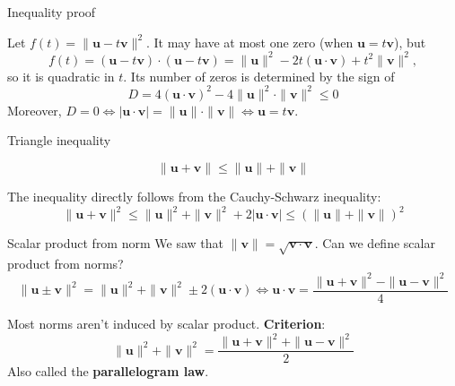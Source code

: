 \documentclass[10pt]{beamer}
\begin{document}
\begin{frame}{Inequality proof}
    \begin{center}
        
    \end{center}
    Let $f(t) = \|\mathbf u - t \mathbf v\|^2$. It may have at most one zero (when $\mathbf u = t \mathbf v$), but
    $$
    f(t) = (\mathbf u - t \mathbf v)\cdot (\mathbf u - t \mathbf v) = \|\mathbf u\|^2 - 2t(\mathbf u \cdot \mathbf v) + t^2 \|\mathbf v\|^2,
    $$
    so it is quadratic in $t$. Its number of zeros is determined by the sign of
    $$
    D = 4(\mathbf u \cdot \mathbf v)^2 - 4 \|\mathbf u\|^2 \cdot \|\mathbf v\|^2 \leq 0
    $$
    Moreover, $D=0 \iff |\mathbf u \cdot \mathbf v| = \|\mathbf u\| \cdot \|\mathbf v\| \iff \mathbf u = t \mathbf v$.
\end{frame}

\begin{frame}{Triangle inequality}
    \begin{center}
        
    \end{center}
    $$\|\mathbf u + \mathbf v \| \leq \|\mathbf u\| + \|\mathbf v\|$$

    The inequality directly follows from the Cauchy-Schwarz inequality:
    $$\|\mathbf u + \mathbf v\|^2 \leq \|\mathbf u \|^2 + \|\mathbf v \|^2 + 2 |\mathbf u \cdot \mathbf v| \leq (\|\mathbf u\| + \|\mathbf v\|)^2$$
\end{frame}

\begin{frame}{Scalar product from norm}
    We saw that $\|\mathbf v\| = \sqrt{\mathbf v \cdot \mathbf v}$. Can we define scalar product from norms?
    $$
    \|\mathbf u \pm \mathbf v\|^2 = \|\mathbf u\|^2 + \|\mathbf v\|^2 \pm 2 (\mathbf u \cdot \mathbf v) \iff \mathbf u \cdot \mathbf v = \frac{\|\mathbf u + \mathbf v\|^2 - \|\mathbf u - \mathbf v\|^2}{4}
    $$

    Most norms aren't induced by scalar product. \textbf{Criterion}:
    $$
    \|\mathbf u\|^2+\|\mathbf v\|^2 = \frac{\|\mathbf u + \mathbf v\|^2+\|\mathbf u - \mathbf v\|^2}{2}
    $$
    Also called the \textbf{parallelogram law}.
\end{frame}
\end{document}
